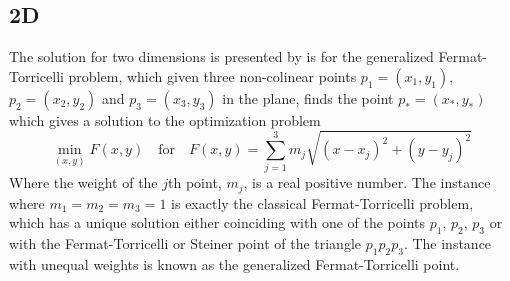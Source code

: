 \subsection{2D}
\label{sec:2d}

The solution for two dimensions is presented by \textcite{uteshev2014} is for
the generalized Fermat-Torricelli problem, which given three non-colinear points
$p_1 = (x_1, y_1)$, $p_2 = (x_2, y_2)$ and $p_3 = (x_3, y_3)$ in the plane,
finds the point $p_\ast = (x_\ast, y_\ast)$ which gives a solution to the
optimization problem
%
\begin{equation}
  \min_{(x,y)} F(x,y) \quad \text{for} \quad F(x,y) = \sum_{j=1}^3 m_j
  \sqrt{{(x-x_j)}^2 + {(y-y_j)}^2}
\end{equation}
%
Where the weight of the $j$th point, $m_j$, is a real positive number. The
instance where $m_1 = m_2 = m_3 = 1$ is exactly the classical Fermat-Torricelli
problem, which has a unique solution either coinciding with one of the points
$p_1$, $p_2$, $p_3$ or with the Fermat-Torricelli or Steiner point of the
triangle $p_1 p_2 p_3$. The instance with unequal weights is known as the
generalized Fermat-Torricelli point.

